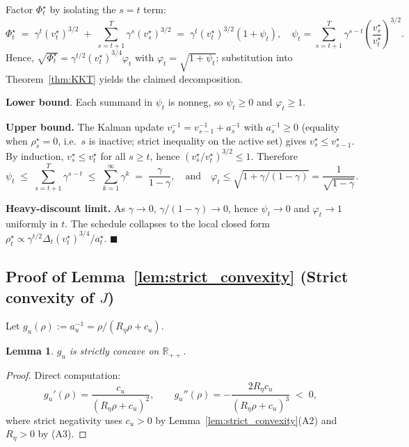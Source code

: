 \documentclass{article}
\newtheorem{lemma}{Lemma}
\begin{document}
Factor $\Phi_t^\star$ by isolating the $s = t$ term:
$$\Phi_t^\star \;=\; \gamma^t (v_t^\star)^{3/2} \;+\; \sum_{s=t+1}^T \gamma^s (v_s^\star)^{3/2} \;=\; \gamma^t (v_t^\star)^{3/2}\!\left(1 + \psi_t\right), \quad \psi_t = \sum_{s=t+1}^T \gamma^{s-t}\!\left(\frac{v_s^\star}{v_t^\star}\right)^{3/2}.$$
Hence, $\sqrt{\Phi_t^\star} = \gamma^{t/2}(v_t^\star)^{3/4}\varphi_t$ with $\varphi_t = \sqrt{1+\psi_t}$; substitution into Theorem~\ref{thm:KKT} yields the claimed decomposition.

\noindent \hspace{0.5cm} \textbf{Lower bound}. Each summand in $\psi_t$ is nonneg, so $\psi_t \ge 0$ and $\varphi_t \ge 1$.

\noindent \hspace{0.5cm} \textbf{Upper bound.} The Kalman update $v_s^{-1} = v_{s-1}^{-1} + a_s^{-1}$ with $a_s^{-1} \ge 0$ (equality when $\rho_s^\star = 0$, i.e.\ $s$ is inactive; strict inequality on the active set) gives $v_s^\star \le v_{s-1}^\star$. By induction, $v_s^\star \le v_t^\star$ for all $s \ge t$, hence $(v_s^\star/v_t^\star)^{3/2} \le 1$. Therefore
$$\psi_t \;\le\; \sum_{s=t+1}^T \gamma^{s-t} \;\le\; \sum_{k=1}^\infty \gamma^k \;=\; \frac{\gamma}{1-\gamma}, \quad \text{and} \quad \varphi_t \le \sqrt{1 + \gamma/(1-\gamma)} = \frac{1}{\sqrt{1-\gamma}}.$$

\noindent \hspace{0.5cm} \textbf{Heavy-discount limit.} As $\gamma \to 0$, $\gamma/(1-\gamma) \to 0$, hence $\psi_t \to 0$ and $\varphi_t \to 1$ uniformly in $t$. The schedule collapses to the local closed form $\rho_t^\star \propto \gamma^{t/2}\Delta_t (v_t^\star)^{3/4}/a_t^\star$. $\blacksquare$

\subsection{Proof of Lemma~\ref{lem:strict_convexity} (Strict convexity of $J$)}\label{app:strict_convexity}

Let $g_u(\rho) := a_u^{-1} = \rho/(R_\eta\rho + c_u)$.

\begin{lemma}
\label{lem:g_u}
    $g_u$ is strictly concave on $\mathbb{R}_{++}$.
\end{lemma}

\begin{proof}
    Direct computation:
$$g_u'(\rho) = \frac{c_u}{(R_\eta\rho + c_u)^2}, \qquad g_u''(\rho) = -\frac{2 R_\eta c_u}{(R_\eta\rho + c_u)^3} \;<\; 0,$$
where strict negativity uses $c_u > 0$ by Lemma~\ref{lem:strict_convexity}(A2) and $R_\eta > 0$ by (A3).
\end{proof}
\end{document}
